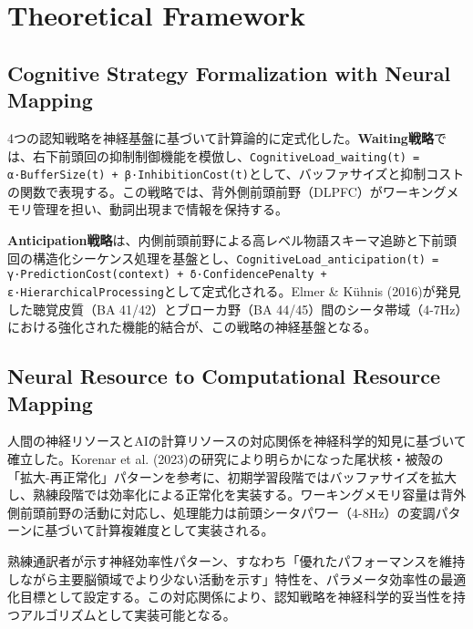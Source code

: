 \section{Theoretical Framework}

\subsection{Cognitive Strategy Formalization with Neural Mapping}

4つの認知戦略を神経基盤に基づいて計算論的に定式化した。\textbf{Waiting戦略}では、右下前頭回の抑制制御機能を模倣し、\texttt{CognitiveLoad\_waiting(t) = α·BufferSize(t) + β·InhibitionCost(t)}として、バッファサイズと抑制コストの関数で表現する。この戦略では、背外側前頭前野（DLPFC）がワーキングメモリ管理を担い、動詞出現まで情報を保持する。

\textbf{Anticipation戦略}は、内側前頭前野による高レベル物語スキーマ追跡と下前頭回の構造化シーケンス処理を基盤とし、\texttt{CognitiveLoad\_anticipation(t) = γ·PredictionCost(context) + δ·ConfidencePenalty + ε·HierarchicalProcessing}として定式化される。Elmer \& Kühnis (2016)が発見した聴覚皮質（BA 41/42）とブローカ野（BA 44/45）間のシータ帯域（4-7Hz）における強化された機能的結合が、この戦略の神経基盤となる。 


\subsection{Neural Resource to Computational Resource Mapping}

人間の神経リソースとAIの計算リソースの対応関係を神経科学的知見に基づいて確立した。Korenar et al. (2023)の研究により明らかになった尾状核・被殻の「拡大-再正常化」パターンを参考に、初期学習段階ではバッファサイズを拡大し、熟練段階では効率化による正常化を実装する。ワーキングメモリ容量は背外側前頭前野の活動に対応し、処理能力は前頭シータパワー（4-8Hz）の変調パターンに基づいて計算複雑度として実装される。

熟練通訳者が示す神経効率性パターン、すなわち「優れたパフォーマンスを維持しながら主要脳領域でより少ない活動を示す」特性を、パラメータ効率性の最適化目標として設定する。この対応関係により、認知戦略を神経科学的妥当性を持つアルゴリズムとして実装可能となる。 
